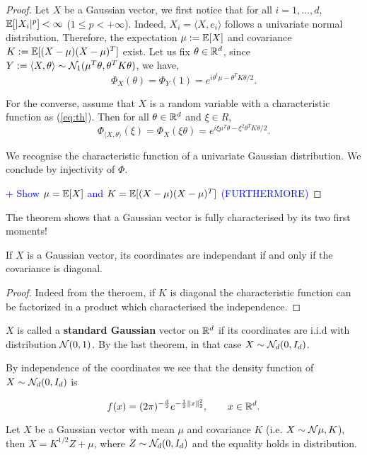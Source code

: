\documentclass{article}
\begin{document}
\begin{proof}
  Let $X$ be a Gaussian vector, we first notice that for all $i=1,\ldots,d$,
  $\mathbb{E}[|X_i|^p] < \infty$ ($1\leq p < +\infty$). Indeed, $X_i = \langle X,e_i
  \rangle$ follows a univariate normal distribution. Therefore, the expectation
  $\mu:=\mathbb{E}[X]$ and covariance $K:=\mathbb{E}[(X-\mu)(X-\mu)^T]$ exist. 
  Let us fix $\theta \in \mathbb{R}^{d}$, since $Y:= \langle X,\theta \rangle \sim
  \mathcal{N}_1(\mu^T\theta, \theta^TK\theta)$, we have, $$\Phi_{X}(\theta) = \Phi_Y(1)
  = e^{i\theta^t\mu - \theta^TK\theta/2}.$$

  For the converse, assume that $X$ is a random variable with a characteristic
  function as (\ref{eq:th}). Then for all $\theta \in \mathbb{R}^{d}$ and $\xi \in R$,
  $$\Phi_{\langle X,\theta \rangle}(\xi) = \Phi_X(\xi \theta)
  = e^{i \xi \mu^T\theta - \xi^2 \theta^TK\theta/2}.$$

  We recognise the characteristic function of a univariate Gaussian
  distribution. We conclude by injectivity of $\Phi$.

  \textcolor{blue}{+ Show $\mu=\mathbb{E}[X]$ and $K=\mathbb{E}[(X-\mu)(X-\mu)^T]$ (FURTHERMORE)}
\end{proof}

The theorem shows that a Gaussian vector is fully characterised by its two first
moments!

\begin{corollary}
  If $X$ is a Gaussian vector, its coordinates are independant if and only if
  the covariance is diagonal. 
\end{corollary}

\begin{proof}
  Indeed from the theroem, if $K$ is diagonal the characteristic function can be
  factorized in a product which characterised the independence. 
\end{proof}

\begin{definition}
  $X$ is called a \textbf{standard Gaussian} vector on $\mathbb{R}^{d}$ if its coordinates are i.i.d with distribution
  $\mathcal{N}(0,1)$. By the last theorem, in that case $X \sim \mathcal{N}_d(0,I_d)$.
\end{definition}

By independence of the coordinates we see that the
density function of $X \sim \mathcal{N}_d(0,I_d)$ is

$$f(x)=(2 \pi)^{-\frac{d}{2}} e^{-\frac{1}{2}\|x\|_2^{2}}, \qquad x \in \mathbb{R}^{d}.$$

\begin{theorem}
  Let $X$ be a Gaussian vector with mean $\mu$ and covariance $K$ (i.e. $X \sim \mathcal{N}{\mu,K}$), then $X =
  K^{1/2}Z + \mu$, where $Z \sim \mathcal{N}_d(0,I_d)$ and the equality holds in
  distribution. 
\end{theorem}
\end{document}
